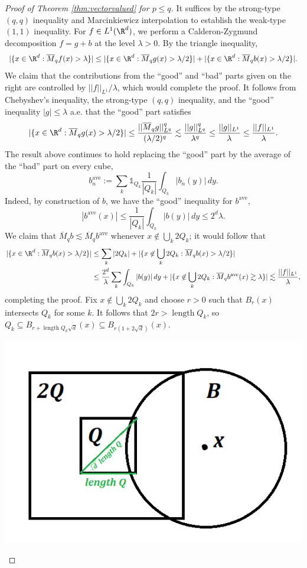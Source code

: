 \documentclass[reqno]{amsart}
\theoremstyle{definition}
\theoremstyle{remark}
\begin{document}
\begin{proof}[Proof of Theorem \ref{thm:vectorvalued} for $p \leq q$]
	It suffices by the strong-type $(q, q)$ inequality and Marcinkiewicz interpolation to establish the weak-type $(1, 1)$ inequality. For $f \in L^1 (\R^d)$, we perform a Calderon-Zygmund decomposition $f = g + b$ at the level $\lambda > 0$. By the triangle inequality, 
		\[ |\{ x \in \R^d : \overline M_q f(x) > \lambda \}| \leq |\{ x \in \R^d : \overline M_q g(x) > \lambda/2 \}| + |\{ x \in \R^d : \overline M_q b(x) > \lambda/2 \}|.  \]
	We claim that the contributions from the ``good'' and ``bad'' parts given on the right are controlled by $||f||_{L^1}/\lambda$, which would complete the proof. It follows from Chebyshev's inequality, the strong-type $(q, q)$ inequality, and the ``good'' inequality $|g| \leq \lambda$ a.e. that the ``good''	part satisfies
		\[
			 |\{ x \in \R^d : \overline M_q g(x) > \lambda/2 \}| \leq \frac{||\overline M_q g||_{L^q}^q}{(\lambda/2)^q} \lesssim \frac{||g||_{L^q}^q}{\lambda^q} \leq \frac{||g||_{L^1}}{\lambda} \leq \frac{||f||_{L^1}}{\lambda}. 
		\]
	The result above continues to hold replacing the ``good'' part by the average of the ``bad'' part on every cube, 
		\[ b^{\text{ave}}_n := \sum_k \mathbb 1_{Q_k} \frac{1}{|Q_k|} \int_{Q_k} |b_n (y)| \, dy. \]	
	Indeed, by construction of $b$, we have the ``good'' inequality for $b^{\text{ave}}$, 
		\[ |b^{\text{ave}} (x)| \leq \frac{1}{|Q_k|} \int_{Q_k} |b(y)| \, dy \leq 2^d \lambda.  \]
	We claim that $\overline M_q b \lesssim \overline M_q b^{\text{ave}}$ whenever $x \not\in \bigcup_k 2Q_k$; it would follow that 
		\begin{align*}
			 |\{ x \in \R^d : \overline M_q b(x) > \lambda/2 \}|
			 	&\leq \sum_k |2Q_k| + |\{ x \not\in \bigcup_k 2Q_k : \overline M_q b(x) > \lambda/2 \}| \\
			 	&\leq \frac{2^d}{\lambda} \sum_k \int_{Q_k} |b(y)| \, dy + |\{ x \not\in \bigcup_k 2Q_k : \overline M_q b^{\text{ave}}(x) \gtrsim \lambda \}| \lesssim \frac{||f||_{L^1}}{\lambda},
		\end{align*}	 	
	completing the proof. Fix $x \not\in \bigcup_k 2Q_k$ and choose $r > 0$ such that $B_r(x)$ intersects $Q_k$ for some $k$. It follows that $2r > \operatorname{length} Q_k$, so $Q_k \subseteq  B_{r +   \operatorname{length} Q_k \sqrt d} (x) \subseteq B_{r(1 + 2 \sqrt d)} (x)$.
	\begin{center}
		\includegraphics[scale = 0.5]{cubes}

\end{center}
\end{proof}
\end{document}
